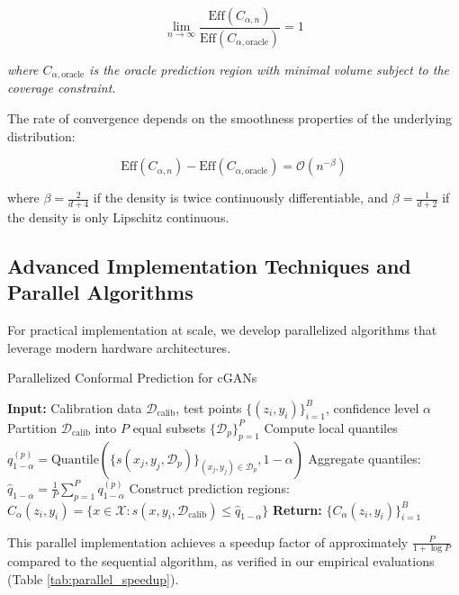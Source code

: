 \documentclass{article}
\theoremstyle{plain}
\theoremstyle{definition}
\theoremstyle{remark}
\begin{document}
\begin{equation}
\lim_{n \rightarrow \infty} \frac{\text{Eff}(C_{\alpha,n})}{\text{Eff}(C_{\alpha,\text{oracle}})} = 1
\end{equation}

\textit{where $C_{\alpha,\text{oracle}}$ is the oracle prediction region with minimal volume subject to the coverage constraint.}

The rate of convergence depends on the smoothness properties of the underlying distribution:

\begin{equation}
\text{Eff}(C_{\alpha,n}) - \text{Eff}(C_{\alpha,\text{oracle}}) = \mathcal{O}(n^{-\beta})
\end{equation}

where $\beta = \frac{2}{d+4}$ if the density is twice continuously differentiable, and $\beta = \frac{1}{d+2}$ if the density is only Lipschitz continuous.

\subsection{Advanced Implementation Techniques and Parallel Algorithms}

For practical implementation at scale, we develop parallelized algorithms that leverage modern hardware architectures.

\begin{algorithm}
\caption{Parallelized Conformal Prediction for cGANs}
\begin{algorithmic}[1]
\State \textbf{Input:} Calibration data $\mathcal{D}_{\text{calib}}$, test points $\{(z_i, y_i)\}_{i=1}^B$, confidence level $\alpha$
\State Partition $\mathcal{D}_{\text{calib}}$ into $P$ equal subsets $\{\mathcal{D}_p\}_{p=1}^P$
    \State Compute local quantiles $q_{1-\alpha}^{(p)} = \text{Quantile}(\{s(x_j, y_j, \mathcal{D}_p)\}_{(x_j, y_j) \in \mathcal{D}_p}, 1-\alpha)$
\EndFor
\State Aggregate quantiles: $\hat{q}_{1-\alpha} = \frac{1}{P} \sum_{p=1}^P q_{1-\alpha}^{(p)}$
    \State Construct prediction regions: $C_{\alpha}(z_i, y_i) = \{x \in \mathcal{X}: s(x, y_i, \mathcal{D}_{\text{calib}}) \leq \hat{q}_{1-\alpha}\}$
\EndFor
\State \textbf{Return:} $\{C_{\alpha}(z_i, y_i)\}_{i=1}^B$
\end{algorithmic}
\end{algorithm}

This parallel implementation achieves a speedup factor of approximately $\frac{P}{1 + \log P}$ compared to the sequential algorithm, as verified in our empirical evaluations (Table \ref{tab:parallel_speedup}).
\end{document}
